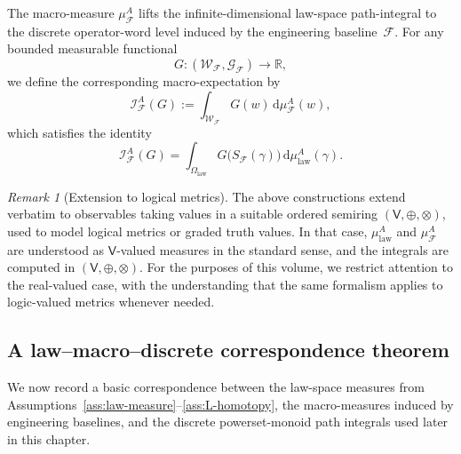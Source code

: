 \documentclass[11pt]{book}
\theoremstyle{plain}
\theoremstyle{definition}
\theoremstyle{remark}
\newtheorem{remark}[theorem]{Remark}
\newcommand{\R}{\mathbb{R}}
\begin{document}
The macro-measure $\mu_{\mathcal{F}}^A$ lifts the infinite-dimensional
law-space path-integral to the discrete operator-word level induced by
the engineering baseline~$\mathcal{F}$.
For any bounded measurable functional
\[
  G : (\mathcal{W}_{\mathcal{F}}, \mathcal{G}_{\mathcal{F}})
  \longrightarrow \R,
\]
we define the corresponding macro-expectation by
\[
  \mathcal{I}_{\mathcal{F}}^A(G)
  :=
  \int_{\mathcal{W}_{\mathcal{F}}} G(w)\,\mathrm{d}\mu_{\mathcal{F}}^A(w),
\]
which satisfies the identity
\[
  \mathcal{I}_{\mathcal{F}}^A(G)
  =
  \int_{\Omega_{\mathrm{law}}}
    G\bigl(S_{\mathcal{F}}(\gamma)\bigr)\,\mathrm{d}\mu_{\mathrm{law}}^A(\gamma).
\]

\begin{remark}[Extension to logical metrics]
The above constructions extend verbatim to observables taking values in
a suitable ordered semiring $(\mathsf{V},\oplus,\otimes)$, used to model
logical metrics or graded truth values.
In that case, $\mu_{\mathrm{law}}^A$ and $\mu_{\mathcal{F}}^A$ are
understood as $\mathsf{V}$-valued measures in the standard sense, and
the integrals are computed in $(\mathsf{V},\oplus,\otimes)$.
For the purposes of this volume, we restrict attention to the real-valued
case, with the understanding that the same formalism applies to
logic-valued metrics whenever needed.
\end{remark}

\subsection{A law--macro--discrete correspondence theorem}

We now record a basic correspondence between the law-space measures
from Assumptions~\ref{ass:law-measure}--\ref{ass:L-homotopy}, the
macro-measures induced by engineering baselines, and the discrete
powerset-monoid path integrals used later in this chapter.
\end{document}
